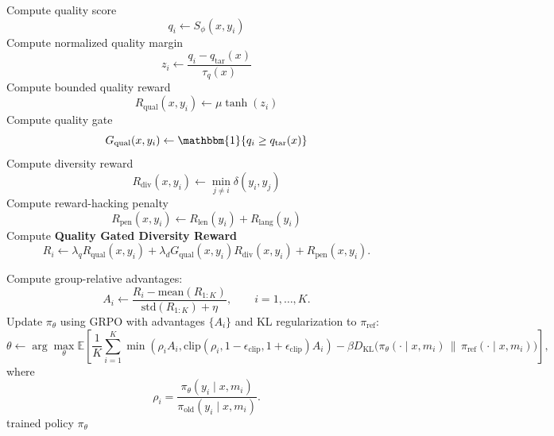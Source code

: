 \begin{breakablealgorithm}
\begin{algorithmic}[1]
            \State Compute quality score
            \[
            q_i \gets S_{\phi}(x,y_i)
            \]
            \State Compute normalized quality margin
            \[
            z_i \gets \frac{q_i-q_{\mathrm{tar}}(x)}{\tau_q(x)}
            \]
            \State Compute bounded quality reward
            \[
            R_{\mathrm{qual}}(x,y_i)
            \gets
            \mu\tanh(z_i)
            \]
            \State Compute quality gate
            \[
            G_{\mathrm{qual}}(x,y_i)
            \gets
            \mathbbm{1}\{q_i \ge q_{\mathrm{tar}}(x)\}
            \]
            \State Compute diversity reward
        \[
            R_{\mathrm{div}}(x,y_i)
            \gets
            \min_{j\neq i}\delta(y_i,y_j)
            \]
            \State Compute reward-hacking penalty
            \[
            R_{\mathrm{pen}}(x,y_i)
            \gets
            R_{\mathrm{len}}(y_i)+R_{\mathrm{lang}}(y_i)
            \]
            \State Compute \textbf{Quality Gated Diversity Reward}
            \[
            R_i
            \gets
            \lambda_q R_{\mathrm{qual}}(x,y_i)
            +
            \lambda_d G_{\mathrm{qual}}(x,y_i)R_{\mathrm{div}}(x,y_i)
            +
            R_{\mathrm{pen}}(x,y_i).
            \]
        \EndFor
        \Statex

        \State Compute group-relative advantages:
        \[
        A_i
        \gets
        \frac{R_i-\mathrm{mean}(R_{1:K})}
        {\mathrm{std}(R_{1:K})+\eta},
        \qquad i=1,\ldots,K.
        \]
    \EndFor
    \State Update $\pi_{\theta}$ using GRPO with advantages $\{A_i\}$ and KL regularization to $\pi_{\mathrm{ref}}$:
    \[
    \theta
    \gets
    \arg\max_{\theta}
    \mathbb{E}
    \left[
    \frac{1}{K}\sum_{i=1}^{K}
    \min\left(
    \rho_i A_i,
    \mathrm{clip}(\rho_i,1-\epsilon_{\mathrm{clip}},1+\epsilon_{\mathrm{clip}})A_i
    \right)
    -
    \beta D_{\mathrm{KL}}\bigl(\pi_{\theta}(\cdot\mid x,m_i)\,\|\,\pi_{\mathrm{ref}}(\cdot\mid x,m_i)\bigr)
    \right],
    \]
    where
    \[
    \rho_i
    =
    \frac{\pi_{\theta}(y_i\mid x,m_i)}
    {\pi_{\mathrm{old}}(y_i\mid x,m_i)}.
    \]
\EndFor
\State \Return trained policy $\pi_{\theta}$
\end{algorithmic}
\end{breakablealgorithm}